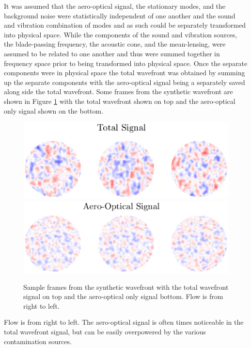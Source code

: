 It was assumed that the aero-optical signal, the stationary modes, and the background noise were statistically independent of one another and the sound and vibration combination of modes and as such could be separately transformed into physical space.
While the components of the sound and vibration sources, the blade-passing frequency, the acoustic cone, and the mean-lensing, were assumed to be related to one another and thus were summed together in frequency space prior to being transformed into physical space.
Once the separate components were in physical space the total wavefront was obtained by summing up the separate components with the aero-optical signal being a separately saved along side the total wavefront.
Some frames from the synthetic wavefront are shown in Figure \ref{fig:05_synthetic_frames} with the total wavefront shown on top and the aero-optical only signal shown on the bottom.
\begin{figure}
 \centering
 \includegraphics{../matlab/05_synthetic_wavefront/synthetic_frames_total.eps}
 \includegraphics{../matlab/05_synthetic_wavefront/synthetic_frames_ao.eps}
 \caption{Sample frames from the synthetic wavefront with the total wavefront signal on top and the aero-optical only signal bottom.  Flow is from right to left.}
 \label{fig:05_synthetic_frames}
\end{figure}
Flow is from right to left.
The aero-optical signal is often times noticeable in the total wavefront signal, but can be easily overpowered by the various contamination sources.

